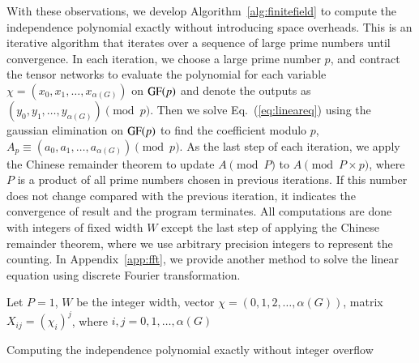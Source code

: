 \documentclass[onefignum, onetabnum]{siamart190516}
\newcommand{\<}{\langle}
\renewcommand{\>}{\rangle}
\newcommand{\Eq}[1]{Eq.~(\ref{#1})}
\newcommand{\App}[1]{Appendix~\ref{#1}}
\begin{document}
With these observations, we develop Algorithm~\ref{alg:finitefield} to compute the independence polynomial exactly without introducing space overheads.
This is an iterative algorithm that iterates over a sequence of large prime numbers until convergence.
In each iteration, we choose a large prime number $p$, and contract the tensor networks to evaluate the polynomial for each variable $\chi = (x_{0}, x_{1}, \ldots, x_{\alpha(G)})$ on ${\rm GF}(p)$ and denote the outputs as $(y_0, y_1, \ldots, y_{\alpha(G)}) \pmod p$.
Then we solve \Eq{eq:lineareq} using the gaussian elimination on ${\rm GF}(p)$ to find the coefficient modulo $p$, $A_p \equiv (a_0, a_1, \ldots, a_{\alpha(G)})\pmod p$.
As the last step of each iteration, we apply the Chinese remainder theorem to update $A \pmod P $ to $ A \pmod {P\times p}$, where $P$ is a product of all prime numbers chosen in previous iterations.
If this number does not change compared with the previous iteration, it indicates the convergence of result and the program terminates.
All computations are done with integers of fixed width $W$ except the last step of applying the Chinese remainder theorem, where we use arbitrary precision integers to represent the counting.
In \App{app:fft}, we provide another method to solve the linear equation using discrete Fourier transformation.

\LinesNumberedHidden
\begin{algorithm}[!ht]
    \small
    \SetAlgoNoLine
    Let $P = 1$, $W$ be the integer width, vector $\chi = (0,1,2, \ldots, \alpha(G))$, matrix $X_{ij} = (\chi_i)^j$, where $i,j = 0, 1, \ldots, \alpha(G)$\;

    \caption{Computing the independence polynomial exactly without integer overflow}\label{alg:finitefield} 
\end{algorithm}
\end{document}
